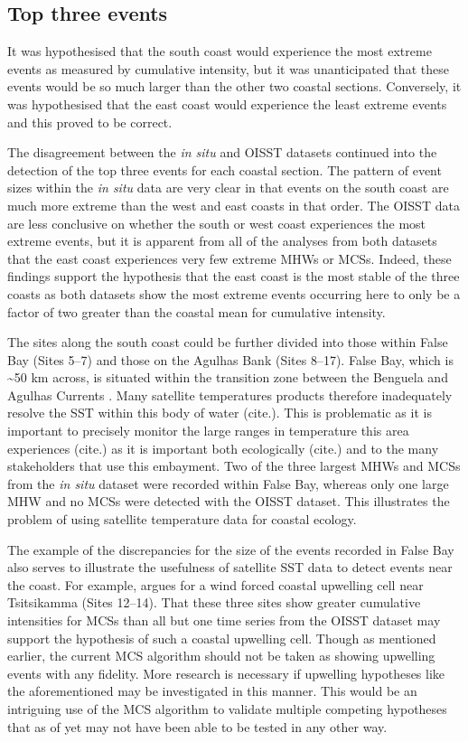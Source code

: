 \documentclass[a4paper,10pt,review]{elsarticle}
\begin{document}
\subsection{Top three events}
It was hypothesised that the south coast would experience the most extreme events as measured by cumulative intensity, but it was unanticipated that these events would be so much larger than the other two coastal sections. Conversely, it was hypothesised that the east coast would experience the least extreme events and this proved to be correct.

The disagreement between the \emph{in situ} and OISST datasets continued into the detection of the top three events for each coastal section. The pattern of event sizes within the \emph{in situ} data are very clear in that events on the south coast are much more extreme than the west and east coasts in that order. The OISST data are less conclusive on whether the south or west coast experiences the most extreme events, but it is apparent from all of the analyses from both datasets that the east coast experiences very few extreme MHWs or MCSs. Indeed, these findings support the hypothesis that the east coast is the most stable of the three coasts as both datasets show the most extreme events occurring here to only be a factor of two greater than the coastal mean for cumulative intensity.

The sites along the south coast could be further divided into those within False Bay (Sites 5--7) and those on the Agulhas Bank (Sites 8--17). False Bay, which is \textasciitilde 50 km across, is situated within the transition zone between the Benguela and Agulhas Currents \citep{Smit2013}. Many satellite temperatures products therefore inadequately resolve the SST within this body of water  (cite.). This is problematic as it is important to precisely monitor the large ranges in temperature this area experiences (cite.) as it is important both ecologically (cite.) and to the many stakeholders that use this embayment. Two of the three largest MHWs and MCSs from the \emph{in situ} dataset were recorded within False Bay, whereas only one large MHW and no MCSs were detected with the OISST dataset. This illustrates the problem of using satellite temperature data for coastal ecology.

The example of the discrepancies for the size of the events recorded in False Bay also serves to illustrate the usefulness of satellite SST data to detect events near the coast. For example, \citet{Roberts2005} argues for a wind forced coastal upwelling cell near Tsitsikamma (Sites 12--14). That these three sites show greater cumulative intensities for MCSs than all but one time series from the OISST dataset may support the hypothesis of such a coastal upwelling cell. Though as mentioned earlier, the current MCS algorithm should not be taken as showing upwelling events with any fidelity. More research is necessary if upwelling hypotheses like the aforementioned may be investigated in this manner. This would be an intriguing use of the MCS algorithm to validate multiple competing hypotheses that as of yet may not have been able to be tested in any other way.
\end{document}
